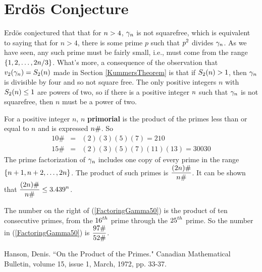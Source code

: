 \fi



\section*{Erd\"{o}s Conjecture}

Erd\"{o}s conjectured that that for $\displaystyle n>4$, $\displaystyle \gamma_n$ is not squarefree, which is equivalent to saying that for $n>4$, there is some prime $p$ such that $\displaystyle p^2$ divides $\displaystyle \gamma_n$. As we have seen, any such prime must be fairly small, i.e., must come from the range $\displaystyle \left\{ 1,2,\ldots, 2n/3\right\}$. What's more, a consequence of the observation that $\displaystyle v_2(\gamma_n) = S_2(n)$ made in Section \ref{KummersTheorem} is that if $\displaystyle S_2(n)>1$, then $\displaystyle \gamma_n$ is divisible by four and so not square free. The only positive integers $n$ with $\displaystyle S_2(n)\leq 1$ are powers of two, so if there is a positive integer $\displaystyle n$ such that $\displaystyle \gamma_n$ is not squarefree, then $n$ must be a power of two.

For a positive integer $n$, $n$ \textbf{primorial} is the product of the primes less than or equal to $n$ and is expressed $\displaystyle n\# $. So
\begin{eqnarray*}
 10\# & = & (2)(3)(5)(7) = 210 \\
 15 \# & = & (2)(3)(5)(7)(11)(13) = 30030
\end{eqnarray*}
The prime factorization of $\displaystyle \gamma_n$ includes one copy of every prime in the range $\displaystyle \left\{ n+1, n+2, \ldots, 2n\right\}$. The product of such primes is $\displaystyle \frac{(2n)\#}{n \#}$. It can be shown that $\displaystyle \frac{(2n)\#}{n \#} \leq 3.439^n$.



The number on the right of (\ref{FactoringGamma50}) is the product of ten consecutive primes, from the $\displaystyle 16^{th}$ prime through the $\displaystyle 25^{th}$ prime. 
So the number in (\ref{FactoringGamma50}) is $\displaystyle \frac{97 \#}{52 \#}$.



\begin{thebibliography}{99} 

 Hanson, Denis. ``On the Product of the Primes." Canadian Mathematical Bulletin, volume 15, issue 1, March, 1972, pp. 33-37.

\end{thebibliography}
\fi




